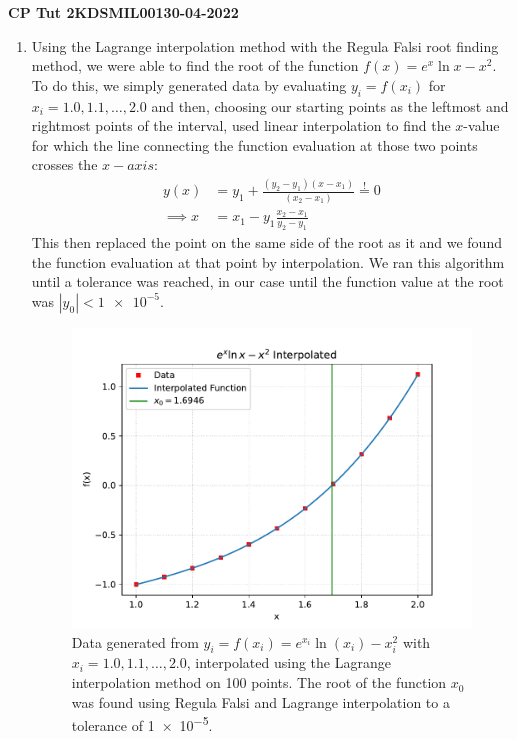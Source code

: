 \documentclass[11pt]{article}
\begin{document}
\begin{center}
    \textbf{CP Tut 2}\hspace{2in}\textbf{KDSMIL001}\hspace{2in}\textbf{30-04-2022}
\end{center}

\begin{enumerate}
    \item Using the Lagrange interpolation method with the Regula Falsi root finding method, we were able to find the root of the function $f(x)=e^x \ln x-x^2$. \\
    To do this, we simply generated data by evaluating $y_i=f(x_i)$ for $x_i=1.0, 1.1, \dots, 2.0$ and then, choosing our starting points as the leftmost and rightmost points of the interval, used linear interpolation to find the $x$-value for which the line connecting the function evaluation at those two points crosses the $x-axis$:
    \begin{align*}
        y(x)&=y_1+\frac{(y_2-y_1)(x-x_1)}{(x_2-x_1)} \overset ! = 0\\
        \implies x&=x_1-y_1\frac{x_2-x_1}{y_2-y_1}
    \end{align*}
    This then replaced the point on the same side of the root as it and we found the function evaluation at that point by interpolation. We ran this algorithm until a tolerance was reached, in our case until the function value at the root was $|y_0|<\num{1e-5}$. 

    \begin{figure}[H]
        \begin{center}
            \includegraphics[width=.6\textwidth]{Plots/q1.pdf}
            \caption{Data generated from $y_i=f(x_i)=e^{x_i} \ln(x_i)-x_i^2$ with $x_i=1.0, 1.1, \dots, 2.0$, interpolated using the Lagrange interpolation method on 100 points. The root of the function $x_0$ was found using Regula Falsi and Lagrange interpolation to a tolerance of \num{1e-5}.}
            \label{fig:q1}
        \end{center}
    \end{figure}


\end{enumerate}
\end{document}
